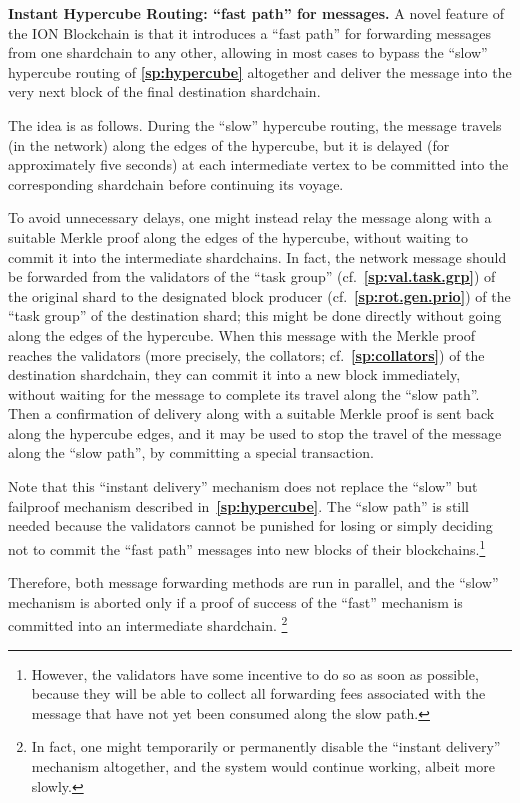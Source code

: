\documentclass[12pt,oneside]{article}
\def\makepoint#1{\medbreak\noindent{\bf #1.\ }}
\def\nxsubpoint{\refstepcounter{subsubsection}%
  \smallbreak\makepoint{\thesubsubsection}}
\def\refpoint#1{{\rm\textbf{\ref{#1}}}}
\let\ptref=\refpoint
\def\embt(#1.){\textbf{#1.}}
\begin{document}
\nxsubpoint\label{sp:instant.hypercube} \embt(Instant Hypercube
Routing: ``fast path'' for messages.)  A novel feature of the ION
Blockchain is that it introduces a ``fast path'' for forwarding
messages from one shardchain to any other, allowing in most cases to
bypass the ``slow'' hypercube routing of \ptref{sp:hypercube}
altogether and deliver the message into the very next block of the
final destination shardchain.

The idea is as follows. During the ``slow'' hypercube routing, the
message travels (in the network) along the edges of the hypercube, but
it is delayed (for approximately five seconds) at each intermediate
vertex to be committed into the corresponding shardchain before
continuing its voyage. 

To avoid unnecessary delays, one might instead relay the message along
with a suitable Merkle proof along the edges of the hypercube, without
waiting to commit it into the intermediate shardchains. In fact, the
network message should be forwarded from the validators of the ``task
group'' (cf.~\ptref{sp:val.task.grp}) of the original shard to the
designated block producer (cf.~\ptref{sp:rot.gen.prio}) of the ``task
group'' of the destination shard; this might be done directly without
going along the edges of the hypercube. When this message with the
Merkle proof reaches the validators (more precisely, the collators;
cf.~\ptref{sp:collators}) of the destination shardchain, they can
commit it into a new block immediately, without waiting for the
message to complete its travel along the ``slow path''. Then a
confirmation of delivery along with a suitable Merkle proof is sent
back along the hypercube edges, and it may be used to stop the travel
of the message along the ``slow path'', by committing a special
transaction.

Note that this ``instant delivery'' mechanism does not replace the
``slow'' but failproof mechanism described
in~\ptref{sp:hypercube}. The ``slow path'' is still needed because the
validators cannot be punished for losing or simply deciding not to
commit the ``fast path'' messages into new blocks of their
blockchains.\footnote{However, the validators have some incentive to do
  so as soon as possible, because they will be able to collect all
  forwarding fees associated with the message that have not yet been
  consumed along the slow path.}

Therefore, both message forwarding methods are run in parallel, and
the ``slow'' mechanism is aborted only if a proof of success of the
``fast'' mechanism is committed into an intermediate shardchain.%
\footnote{In fact, one might temporarily or permanently disable the
  ``instant delivery'' mechanism altogether, and the system would
  continue working, albeit more slowly.}
\end{document}
